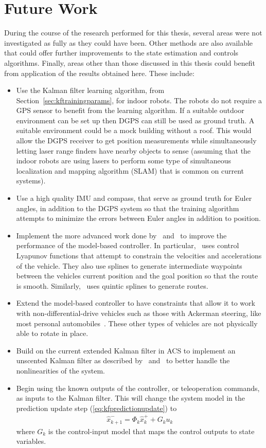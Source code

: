 \section{Future Work}
\label{sec:futureWork}
During the course of the research performed for this thesis, several areas were not investigated as fully as they could have been. Other methods are also available that could offer further improvements to the state estimation and controls algorithms. Finally, areas other than those discussed in this thesis could benefit from application of the results obtained here. These include:
\begin{itemize}
\item Use the Kalman filter learning algorithm, from Section~\ref{sec:kftrainingparams}, for indoor robots. The robots do not require a GPS sensor to benefit from the learning algorithm. If a suitable outdoor environment can be set up then DGPS can still be used as ground truth. A suitable environment could be a mock building without a roof. This would allow the DGPS receiver to get position measurements while simultaneously letting laser range finders have nearby objects to sense (assuming that the indoor robots are using lasers to perform some type of simultaneous localization and mapping algorithm (SLAM) that is common on current systems).
\item Use a high quality IMU and compass, that serve as ground truth for Euler angles, in addition to the DGPS system so that the training algorithm attempts to minimize the errors between Euler angles in addition to position.
\item Implement the more advanced work done by~\cite{Lapierre06} and~\cite{Gulati08} to improve the performance of the model-based controller. In particular,~\cite{Gulati08} uses control Lyapunov functions that attempt to constrain the velocities and accelerations of the vehicle. They also use splines to generate intermediate waypoints between the vehicles current position and the goal position so that the route is smooth. Similarly,~\cite{Burgard09} uses quintic splines to generate routes.
\item Extend the model-based controller to have constraints that allow it to work with non-differential-drive vehicles such as those with Ackerman steering, like most personal automobiles~\cite{Shiller91dynamicmotion}. These other types of vehicles are not physically able to rotate in place.
\item Build on the current extended Kalman filter in ACS to implement an unscented Kalman filter as described by~\cite{ThrunProbRobots06} and~\cite{Orderud05} to better handle the nonlinearities of the system.
\item Begin using the known outputs of the controller, or teleoperation commands, as inputs to the Kalman filter. This will change the system model in the prediction update step (\ref{eq:kfpredictionupdate}) to
\begin{align*}
\hat{x}_{k+1}^- = \Phi_k \hat{x}_k^+ + G_k u_k
\end{align*}
where $G_k$ is the control-input model that maps the control outputs to state variables.
\end{itemize}
